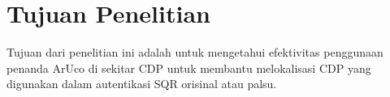 
\section{Tujuan Penelitian}
Tujuan dari penelitian ini adalah untuk mengetahui efektivitas penggunaan penanda ArUco di sekitar CDP untuk membantu melokalisasi CDP yang digunakan dalam
autentikasi SQR orisinal atau palsu.

